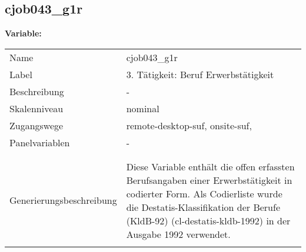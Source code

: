 	
	
	\subsection{cjob043\_g1r}
	\label{subSection:cjob043_g1r}

	\noindent\textbf{Variable:}\\
		\begin{tabular}{lL{11.3cm}}
			\label{tableVariable:cjob043_g1r}
			Name & cjob043\_g1r \\
			Label & 3. Tätigkeit: Beruf Erwerbstätigkeit \\
			Beschreibung & - \\
			Skalenniveau & nominal \\
			Zugangswege &
				remote-desktop-suf,
				onsite-suf,
 \\
			Panelvariablen & -
			 \\
			 \\
 \\
					Generierungsbeschreibung & Diese Variable enthält die offen erfassten Berufsangaben einer Erwerbstätigkeit in codierter Form. Als Codierliste wurde die Destatis-Klassifikation der Berufe (KldB-92) (cl-destatis-kldb-1992) in der Ausgabe 1992 verwendet. 
				 \\	
			 \\
		\end{tabular}






